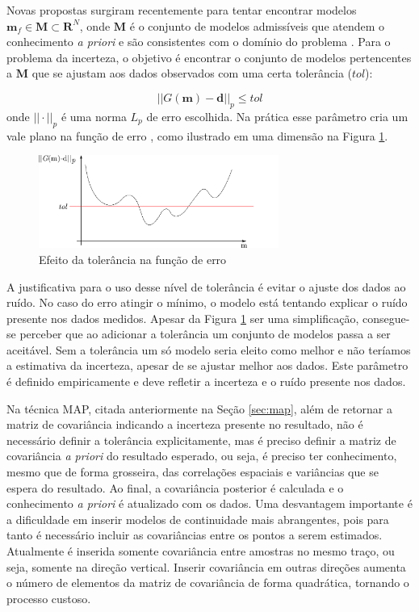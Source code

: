 Novas propostas surgiram recentemente para tentar encontrar modelos
$\mathbf{m}_f \in \mathbf{M} \subset \mathbf{R}^N$, onde $\mathbf M$ é o
conjunto de modelos admissíveis que atendem o conhecimento \textit{a priori} e
são consistentes com o domínio do problema \citep{TompkinsScalabUnce2011}. Para o
problema da incerteza, o objetivo é encontrar o conjunto de modelos pertencentes
a $\mathbf M$ que se ajustam aos dados observados com uma certa tolerância
($tol$):

\begin{equation}
||G\mathbf{(m)-d}||_p \leq tol
\end{equation}
onde $||\cdot||_p$ é uma norma $L_p$ de erro escolhida. Na prática esse
parâmetro cria um vale plano na função de erro  \citep{Martinez2011Topogra}, como
ilustrado em uma dimensão na Figura \ref{fig:erroFunc}.

\begin{figure}[htp]
\begin{center}
  \includegraphics[width=0.7\textwidth]{fig/errorFuncTol}
  \caption{Efeito da tolerância na função de erro}
  \label{fig:erroFunc}
\end{center}
\end{figure}

A justificativa para o uso desse nível de tolerância é evitar o ajuste dos dados
ao ruído. No caso do erro atingir o mínimo, o modelo está tentando explicar o
ruído presente nos dados medidos. Apesar da Figura \ref{fig:erroFunc} ser uma
simplificação, consegue-se perceber que ao adicionar a tolerância um conjunto de
modelos passa a ser aceitável. Sem a tolerância um só modelo seria eleito como
melhor e não teríamos a estimativa da incerteza, apesar de se ajustar melhor aos
dados. Este parâmetro é definido empiricamente e deve refletir a incerteza e o
ruído presente nos dados.

Na técnica MAP, citada anteriormente na Seção \ref{sec:map}, além de retornar a
matriz de covariância indicando a incerteza presente no resultado, não é
necessário definir a tolerância explicitamente, mas é preciso definir a matriz
de covariância \textit{a priori} do resultado esperado, ou seja, é preciso ter
conhecimento, mesmo que de forma grosseira, das correlações espaciais e
variâncias que se espera do resultado. Ao final, a covariância posterior é
calculada e o conhecimento \textit{a priori} é atualizado com os dados. Uma
desvantagem importante é a dificuldade em inserir modelos de continuidade mais abrangentes,
pois para tanto é necessário incluir as covariâncias entre os pontos a serem
estimados. Atualmente é inserida somente covariância entre amostras no mesmo
traço, ou seja, somente na direção vertical. Inserir covariância em outras
direções aumenta o número de elementos da matriz de covariância de forma
quadrática, tornando o processo custoso.

